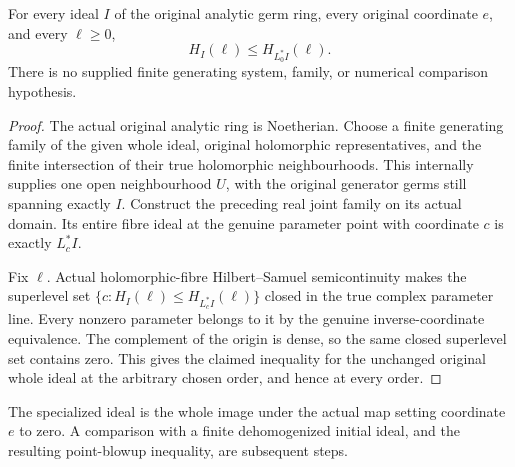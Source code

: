 \begin{theorem}
\label{hir:actual-axis-zero-all-hs}
\leanok
For every ideal $I$ of the original analytic germ ring, every original
coordinate $e$, and every $\ell\ge0$,
\[
 H_I(\ell)\le H_{L_0^*I}(\ell).
\]
There is no supplied finite generating system, family, or numerical
comparison hypothesis.
\end{theorem}
\begin{proof}
The actual original analytic ring is Noetherian. Choose a finite generating
family of the given whole ideal, original holomorphic representatives,
and the finite intersection of their true holomorphic neighbourhoods.
This internally supplies one open neighbourhood $U$, with the original
generator germs still spanning exactly $I$. Construct the preceding real
joint family on its actual domain. Its entire fibre ideal at the genuine
parameter point with coordinate $c$ is exactly $L_c^*I$.

Fix $\ell$. Actual holomorphic-fibre Hilbert--Samuel semicontinuity makes
the superlevel set $\{c:H_I(\ell)\le H_{L_c^*I}(\ell)\}$ closed in
the true complex parameter line. Every nonzero parameter belongs to it
by the genuine inverse-coordinate equivalence. The complement of the
origin is dense, so the same closed superlevel set contains zero. This
gives the claimed inequality for the unchanged original whole ideal at
the arbitrary chosen order, and hence at every order.
\end{proof}

The specialized ideal is the whole image under the actual map setting
coordinate $e$ to zero. A comparison with a finite dehomogenized initial
ideal, and the resulting point-blowup inequality, are subsequent steps.
